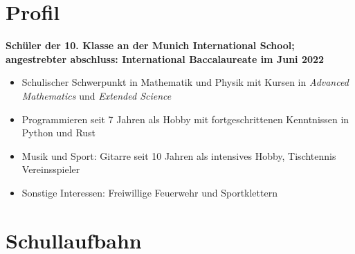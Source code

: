\documentclass[12pt]{article}
\newcommand{\sect}[1]{
  {
    \vspace{12pt}
    \section*{
      \fontsize{18}{0}\selectfont
      \hspace{-12pt}
      \vspace{-12pt}
      #1
    }
    \vspace{-6pt}
  }
}
\begin{document}
\sect{Profil}

\textbf{Sch{\"u}ler der 10. Klasse an der Munich International School; angestrebter
  abschluss: International Baccalaureate im Juni 2022}

\begin{itemize}[leftmargin=*]
  \itemsep0pt

\item Schulischer Schwerpunkt in Mathematik und Physik mit Kursen in \textit{\glqq
  Advanced Mathematics\grqq} und \textit{\glqq Extended Science\grqq}

\item Programmieren seit 7 Jahren als Hobby mit fortgeschrittenen Kenntnissen in
  Python und Rust

\item Musik und Sport: Gitarre seit 10 Jahren als intensives Hobby,
  Tischtennis Vereinsspieler

\item Sonstige Interessen: Freiwillige Feuerwehr und Sportklettern

\end{itemize}
\vspace{-24pt}

\sect{Schullaufbahn}
\vspace{6pt}
\end{document}

